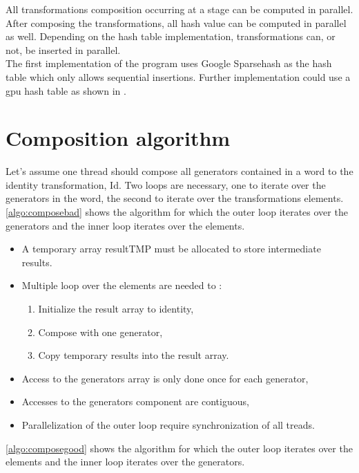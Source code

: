 {All transformations composition occurring at a stage can be computed in parallel. After composing the transformations, all hash value can be computed in parallel as well. Depending on the hash table implementation, transformations can, or not, be inserted in parallel.\\
The first implementation of the program uses Google Sparsehash as the hash table which only allows sequential insertions. Further implementation could use a \gls{gpu} hash table as shown in \cite{wen2011gpu}.


\section{Composition algorithm}
Let's assume one thread should compose all generators contained in a word to the identity transformation, Id. Two loops are necessary, one to iterate over the generators in the word, the second to iterate over the transformations elements.
\autoref{algo:composebad} shows the algorithm for which the outer loop iterates over the generators and the inner loop iterates over the elements.
\begin{itemize}
\item A temporary array resultTMP must be allocated to store intermediate results.
\item Multiple loop over the elements are needed to :
\begin{enumerate}
 \item Initialize the result array to identity,
 \item Compose with one generator,
 \item Copy temporary results into the result array.
 \end{enumerate}
\item Access to the generators array is only done once for each generator,
 \item Accesses to the generators component are contiguous,
 \item Parallelization of the outer loop require synchronization of all treads.
\end{itemize}
\autoref{algo:composegood} shows the algorithm for which the outer loop iterates over the elements and the inner loop iterates over the generators.
\begin{itemize}

\end{itemize}}

